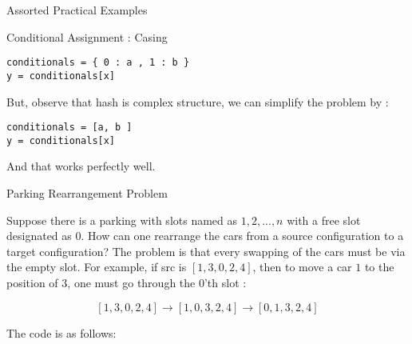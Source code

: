 \begin{section}{Assorted Practical Examples}
\begin{subsection}{Conditional Assignment : Casing }
\begin{center}\begin{minipage}{\linewidth}
\begin{lstlisting}[style=JexlStyle]
conditionals = { 0 : a , 1 : b }
y = conditionals[x]
\end{lstlisting}  
\end{minipage}\end{center}

But, observe that hash is complex structure, we can simplify the problem by :

\begin{center}\begin{minipage}{\linewidth}
\begin{lstlisting}[style=JexlStyle]
conditionals = [a, b ]
y = conditionals[x]
\end{lstlisting}  
\end{minipage}\end{center}
And that works perfectly well. 
\end{subsection}

\begin{subsection}{Parking Rearrangement Problem}

Suppose there is a parking with slots named as $1,2,...,n$ with
a free slot designated as $0$. How can one rearrange the cars from  
a source configuration to a target configuration? The problem is that
every swapping of the cars must be via the empty slot.
For example, if src is $[ 1, 3, 0, 2, 4 ]$, then to move a car $1$ to 
the position of $3$, one must go through the $0$'th slot : 

$$
[ 1, 3, 0, 2, 4 ] \to [ 1, 0, 3, 2, 4 ] \to [ 0, 1, 3, 2, 4 ]
$$

The code is as follows:


\end{subsection}
\end{section}
